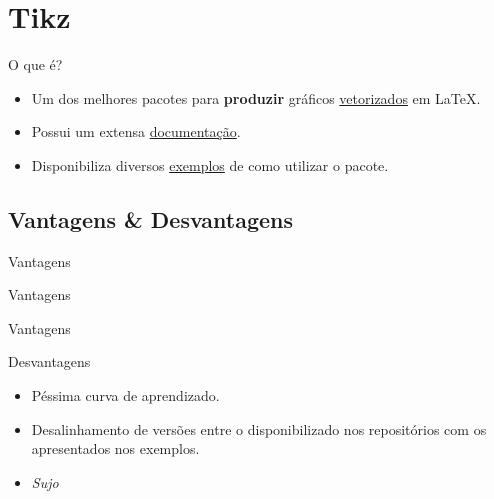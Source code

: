 
\section{Tikz} %
\label{sec:tikz}

\begin{frame}{O que é?}
\begin{block}{}
	\begin{itemize}
		\item Um dos melhores pacotes para {\bf produzir} gráficos \underline{vetorizados} em \LaTeX.
		\item Possui um extensa \href{http://ftp.fau.de/ctan/graphics/pgf/base/doc/pgfmanual.pdf}{documentação}.
		\item Disponibiliza diversos \href{http://www.texample.net/tikz/examples/}{exemplos} de como utilizar o pacote.
	\end{itemize}
\end{block}
\end{frame}

\subsection*{Vantagens \& Desvantagens}
\begin{frame}{Vantagens}
	\begin{multicols}{2}		
	
	
	\end{multicols}
\end{frame}

\begin{frame}{Vantagens}
	\begin{multicols}{2}		
	
	
	\end{multicols}
\end{frame}

\begin{frame}{Vantagens}	
	
\end{frame}


\begin{frame}{Desvantagens}
	\begin{block}{}
		\begin{itemize}
			\item Péssima curva de aprendizado.
			\item Desalinhamento de  versões entre o disponibilizado nos repositórios com os apresentados nos exemplos.
			\item {\it Sujo}
		\end{itemize}
	\end{block}
\end{frame}


